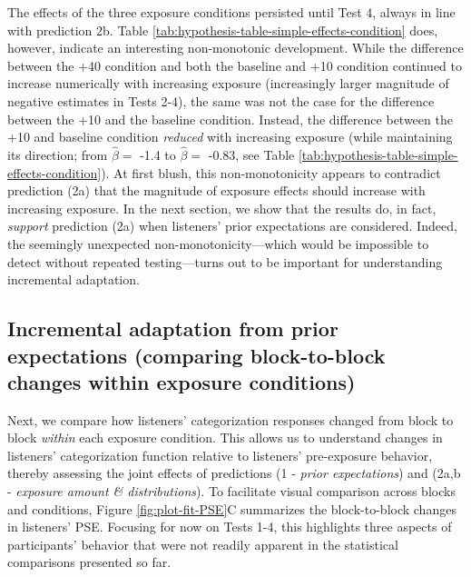 \documentclass[
  11pt,
  man,mask,floatsintext]{apa6}
\begin{document}
The effects of the three exposure conditions persisted until Test 4, always in line with prediction 2b. Table \ref{tab:hypothesis-table-simple-effects-condition} does, however, indicate an interesting non-monotonic development. While the difference between the +40 condition and both the baseline and +10 condition continued to increase numerically with increasing exposure (increasingly larger magnitude of negative estimates in Tests 2-4), the same was not the case for the difference between the +10 and the baseline condition. Instead, the difference between the +10 and baseline condition \emph{reduced} with increasing exposure (while maintaining its direction; from \(\hat{\beta} =\) -1.4 to \(\hat{\beta} =\) -0.83, see Table \ref{tab:hypothesis-table-simple-effects-condition}). At first blush, this non-monotonicity appears to contradict prediction (2a) that the magnitude of exposure effects should increase with increasing exposure. In the next section, we show that the results do, in fact, \emph{support} prediction (2a) when listeners' prior expectations are considered. Indeed, the seemingly unexpected non-monotonicity---which would be impossible to detect without repeated testing---turns out to be important for understanding incremental adaptation.

\subsection{Incremental adaptation from prior expectations (comparing block-to-block changes within exposure conditions)}\label{incremental-adaptation-from-prior-expectations-comparing-block-to-block-changes-within-exposure-conditions}

Next, we compare how listeners' categorization responses changed from block to block \emph{within} each exposure condition. This allows us to understand changes in listeners' categorization function relative to listeners' pre-exposure behavior, thereby assessing the joint effects of predictions (1 - \emph{prior expectations}) and (2a,b - \emph{exposure amount \& distributions}). To facilitate visual comparison across blocks and conditions, Figure \ref{fig:plot-fit-PSE}C summarizes the block-to-block changes in listeners' PSE. Focusing for now on Tests 1-4, this highlights three aspects of participants' behavior that were not readily apparent in the statistical comparisons presented so far.
\end{document}
